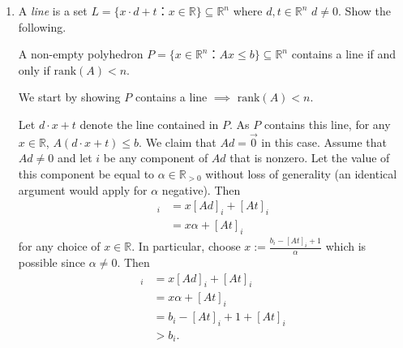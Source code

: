 \documentclass[11pt]{article}
\newcommand{\setR}{\mathbb{R}}
\renewcommand{\leq}{\leqslant}
\newcommand{\rank}{\mathrm{rank}}
\begin{document}
\begin{enumerate}[1)]

  
  
\item \label{item:10}
  A \emph{line} is a set $L = \{ x ⋅ d +t ： x ∈ ℝ\} ⊆ ℝ^n$ where $d,t ∈ ℝ^n$ $d ≠0$. Show the following.

  A non-empty polyhedron $P = \{ x ∈ ℝ^n ： Ax ≤ b\} ⊆ ℝ^n$ contains a line if  and only if $\rank(A) <n$.
  
  \begin{solution}
  We start by showing $P$ contains a line $\implies$ $\rank(A) < n$. 
  
  Let $d \cdot x + t$ denote the line contained in $P$. As $P$ contains this line, for any $x \in \setR$, $A(d\cdot x +t) \leq b$. We claim that $Ad = \vec{0}$ in this case. Assume that $Ad \neq 0$ and let $i$ be any component of $Ad$ that is nonzero. Let the value of this component be equal to $\alpha \in \setR_{>0}$ without loss of generality (an identical argument would apply for $\alpha$ negative). Then 
  \begin{align*}
  	[A(d\cdot x + t)]_i & = x[Ad]_i + [At]_i \\
	& = x \alpha + [At]_i
  \end{align*}
  for any choice of $x \in \setR$. In particular, choose $x := \frac{b_i - [At]_i+1}{\alpha}$ which is possible since $\alpha \neq 0$. Then 
   \begin{align*}
  	[A(d\cdot x + t)]_i & = x[Ad]_i + [At]_i \\
	& = x \alpha + [At]_i \\
	& = b_i -[At]_i + 1 + [At]_i \\
	& > b_i.
  \end{align*}
  

\end{solution}
\end{enumerate}
\end{document}
